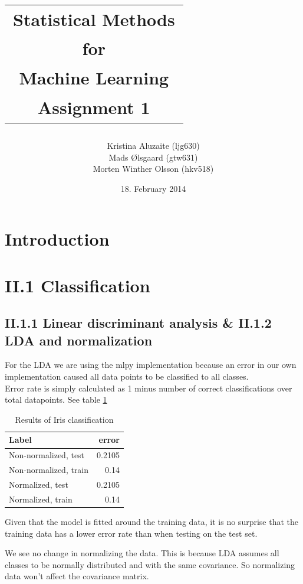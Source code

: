 \documentclass{article}
\title{\begin{tabular}{c}
Statistical Methods\\
for\\
Machine Learning\\
Assignment 1\\
\end{tabular}}
\date{18. February 2014}
\author{\begin{tabular}{c}
Kristina  Aluzaite (ljg630)\\
Mads Ølsgaard (gtw631)\\
Morten Winther Olsson (hkv518)\\
\end{tabular}}
\theoremstyle{dotless}
\newcounter{min}
\newcommand{\Section}[1]{\section{#1}
\setcounter{min}{1}}
\begin{document}

\maketitle
\thispagestyle{fancy}

\newpage{}



\Section{Introduction}


\Section{II.1 Classification}

\subsection{II.1.1 Linear discriminant analysis \& II.1.2 LDA and normalization}


For the LDA we are using the mlpy implementation because an error in our own implementation caused all data points to be classified to all classes.\\

Error rate is simply calculated as 1 minus number of correct classifications over total datapoints. See table \ref{result1.1}\\

\begin{table}[h]
\label{result1.1}
    \centering
    \begin{tabular}{l| r}
        Label & error \\ \hline
        Non-normalized, test & 0.2105 \\
        Non-normalized, train & 0.14 \\ \hline
        Normalized, test & 0.2105 \\
        Normalized, train & 0.14
    \end{tabular}
\caption{Results of Iris classification}
\end{table}

Given that the model is fitted around the training data, it is no surprise that the training data has a lower error rate than when testing on the test set.

We see no change in normalizing the data. This is because LDA assumes all classes to be normally distributed and with the same covariance. So normalizing data won't affect the covariance matrix.
\end{document}
